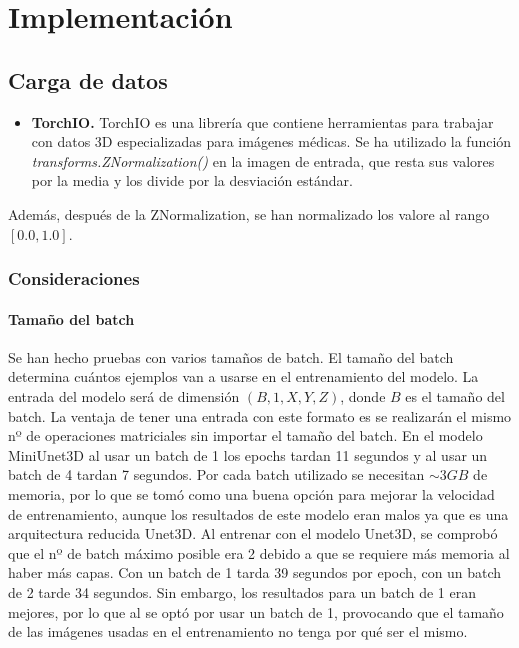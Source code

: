 \chapter{Implementación}\label{implementacion}

\section{Carga de datos}\label{sec:data_loading_processing}
\begin{itemize}
\item \textbf{TorchIO.} TorchIO \cite{PerezGarcia2020} es una librería que contiene herramientas para trabajar con datos 3D especializadas para imágenes médicas. Se ha utilizado la función \textit{transforms.ZNormalization()} en la imagen de entrada, que resta sus valores por la media y los divide por la desviación estándar.

\end{itemize}
Además, después de la ZNormalization, se han normalizado los valore al rango $[0.0, 1.0]$.  

\subsection{Consideraciones}

\subsubsection{Tamaño del batch}

Se han hecho pruebas con varios tamaños de batch. El tamaño del batch determina cuántos ejemplos van a usarse en el entrenamiento del modelo. La entrada del modelo será de dimensión $(B,1,X,Y,Z)$, donde $B$ es el tamaño del batch. La ventaja de tener una entrada con este formato es se realizarán el mismo nº de operaciones matriciales sin importar el tamaño del batch. 
En el modelo MiniUnet3D al usar un batch de 1 los epochs tardan 11 segundos y al usar un batch de 4 tardan 7 segundos. Por cada batch utilizado se necesitan $\sim 3GB$ de memoria, por lo que se tomó como una buena opción para mejorar la velocidad de entrenamiento, aunque los resultados de este modelo eran malos ya que es una arquitectura reducida Unet3D.
Al entrenar con el modelo Unet3D, se comprobó que el nº de batch máximo posible era 2 debido a que se requiere más memoria al haber más capas. Con un batch de 1 tarda 39 segundos por epoch, con un batch de 2 tarde 34 segundos. Sin embargo, los resultados para un batch de 1 eran mejores, por lo que al se optó por usar un batch de 1, provocando que el tamaño de las imágenes usadas en el entrenamiento no tenga por qué ser el mismo.


